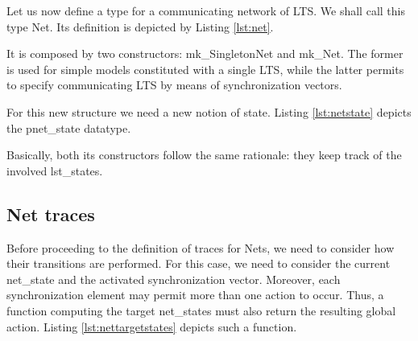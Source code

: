 	Let us now define a type for a communicating network of \ac{LTS}. We shall call this type \textsf{Net}.
	Its definition is depicted by Listing \ref{lst:net}.	

		

	\noindent It is composed by two constructors: \textsf{mk\_SingletonNet} and \textsf{mk\_Net}.
	The former is used for simple models constituted with a single \ac{LTS}, while the latter
	permits to specify communicating \ac{LTS} by means of synchronization vectors.
	
	For this new structure we need a new notion of state. Listing \ref{lst:netstate} depicts the \textsf{pnet\_state}
	datatype.

		

	\noindent Basically, both its constructors follow the same rationale: they keep track of the 
	involved \textsf{lst\_states}. 
	
	
  \subsection{Net traces}	
\label{sub:net traces}		
	
	Before proceeding to the definition of traces for	\textsf{Net}s, we need to consider
	how their transitions are performed. For this case, we need to consider the current
	\textsf{net\_state} and the activated synchronization vector. Moreover, each synchronization
	element may permit more than one \textsf{action} to occur. Thus, a function
	computing the target \textsf{net\_state}s must also return the resulting global action.
	Listing \ref{lst:nettargetstates} depicts such a function.
		
			
	
